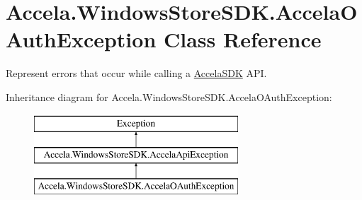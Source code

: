\hypertarget{class_accela_1_1_windows_store_s_d_k_1_1_accela_o_auth_exception}{\section{Accela.\+Windows\+Store\+S\+D\+K.\+Accela\+O\+Auth\+Exception Class Reference}
\label{class_accela_1_1_windows_store_s_d_k_1_1_accela_o_auth_exception}
}


Represent errors that occur while calling a \hyperlink{class_accela_1_1_windows_store_s_d_k_1_1_accela_s_d_k}{Accela\+S\+D\+K} A\+P\+I.  


Inheritance diagram for Accela.\+Windows\+Store\+S\+D\+K.\+Accela\+O\+Auth\+Exception\+:\begin{figure}[H]
\begin{center}
\leavevmode
\includegraphics[height=3.000000cm]{class_accela_1_1_windows_store_s_d_k_1_1_accela_o_auth_exception}
\end{center}
\end{figure}
